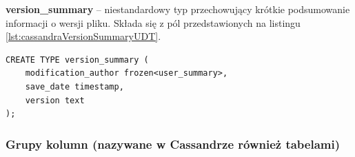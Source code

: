 \begin{itemize}
    \begin{minipage}{\linewidth}
    \item \textbf{version\_summary} -- niestandardowy typ przechowujący krótkie podsumowanie informacji o wersji pliku.
    Składa się z pól przedstawionych na listingu \ref{lst:cassandraVersionSummaryUDT}.
    \begin{lstlisting}[language=CQL,caption={Definicja niestandardowego typu \textit{version\_summary}},label={lst:cassandraVersionSummaryUDT}]
CREATE TYPE version_summary (
    modification_author frozen<user_summary>,
    save_date timestamp,
    version text
);
    \end{lstlisting}
    \end{minipage}
\end{itemize}

\subsubsection{Grupy kolumn (nazywane w Cassandrze również tabelami)}

